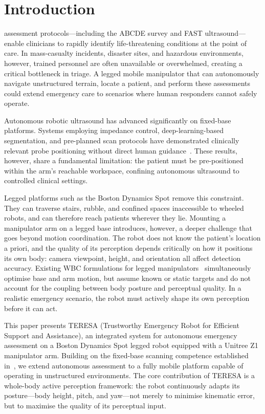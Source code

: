 \section{Introduction}
\label{sec:introduction}

 assessment protocols---including the \acf{ABCDE}
survey and \acf{FAST} ultrasound---enable clinicians to rapidly identify
life-threatening conditions at the point of care. In mass-casualty incidents,
disaster sites, and hazardous environments, however, trained personnel are
often unavailable or overwhelmed, creating a critical bottleneck in triage.
A legged mobile manipulator that can autonomously navigate unstructured
terrain, locate a patient, and perform these assessments could extend
emergency care to scenarios where human responders cannot safely operate.

Autonomous robotic ultrasound has advanced significantly on fixed-base
platforms. Systems employing impedance control, deep-learning-based
segmentation, and pre-planned scan protocols have demonstrated clinically
relevant probe positioning without direct human
guidance~\cite{mathiassen2016, li2021overview, duan2022, farsoni2025autonomous}.
These results, however, share a fundamental limitation: the patient must be
pre-positioned within the arm's reachable workspace, confining autonomous
ultrasound to controlled clinical settings.

Legged platforms such as the Boston Dynamics Spot remove this constraint.
They can traverse stairs, rubble, and confined spaces inaccessible to wheeled
robots, and can therefore reach patients wherever they lie. Mounting a
manipulator arm on a legged base introduces, however, a deeper challenge that
goes beyond motion coordination. The robot does not know the patient's
location a priori, and the quality of its perception depends critically on how
it positions its own body: camera viewpoint, height, and orientation all
affect detection accuracy. Existing \ac{WBC} formulations for legged
manipulators~\cite{bellicoso2019, sleiman2021, haviland2022} simultaneously
optimise base and arm motion, but assume known or static targets and do not
account for the coupling between body posture and perceptual quality. In a
realistic emergency scenario, the robot must actively shape its own perception
before it can act.

This paper presents \acf{TERESA} (Trustworthy Emergency Robot for Efficient
Support and Assistance), an integrated system for autonomous emergency
assessment on a Boston Dynamics Spot legged robot equipped with a Unitree Z1
manipulator arm. Building on the fixed-base scanning competence established
in~\cite{farsoni2025autonomous}, we extend autonomous assessment to a fully
mobile platform capable of operating in unstructured environments. The core
contribution of \ac{TERESA} is a whole-body active perception framework: the
robot continuously adapts its posture---body height, pitch, and yaw---not
merely to minimise kinematic error, but to maximise the quality of its
perceptual input.

